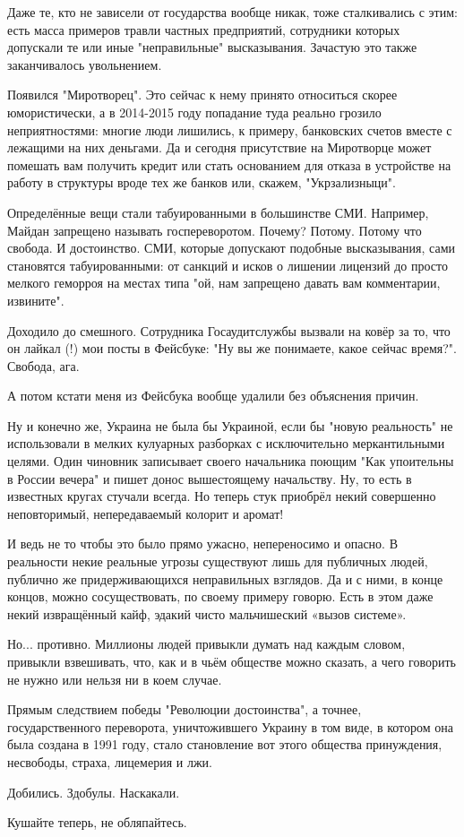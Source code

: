 Даже те, кто не зависели от государства вообще никак, тоже сталкивались с этим:
есть масса примеров травли частных предприятий, сотрудники которых допускали те
или иные "неправильные" высказывания. Зачастую это также заканчивалось
увольнением.

Появился "Миротворец". Это сейчас к нему принято относиться скорее
юмористически, а в 2014-2015 году попадание туда реально грозило
неприятностями: многие люди лишились, к примеру, банковских счетов вместе с
лежащими на них деньгами. Да и сегодня присутствие на Миротворце может помешать
вам получить кредит или стать основанием для отказа в устройстве на работу в
структуры вроде тех же банков или, скажем, "Укрзализныци". 

Определённые вещи стали табуированными в большинстве СМИ. Например, Майдан
запрещено называть госпереворотом. Почему? Потому. Потому что свобода. И
достоинство. СМИ, которые допускают подобные высказывания, сами становятся
табуированными: от санкций и исков о лишении лицензий до просто мелкого
геморроя на местах типа "ой, нам запрещено давать вам комментарии, извините". 

Доходило до смешного. Сотрудника Госаудитслужбы вызвали на ковёр за то, что он
лайкал (!) мои посты в Фейсбуке: "Ну вы же понимаете, какое сейчас время?".
Свобода, ага.

А потом кстати меня из Фейсбука вообще удалили без объяснения причин. 

Ну и конечно же, Украина не была бы Украиной, если бы "новую реальность" не
использовали в мелких кулуарных разборках с исключительно меркантильными
целями. Один чиновник записывает своего начальника поющим "Как упоительны в
России вечера" и пишет донос вышестоящему начальству. Ну, то есть в известных
кругах стучали всегда. Но теперь стук приобрёл некий совершенно неповторимый,
непередаваемый колорит и аромат!

И ведь не то чтобы это было прямо ужасно, непереносимо и опасно. В реальности
некие реальные угрозы существуют лишь для публичных людей, публично же
придерживающихся неправильных взглядов. Да и с ними, в конце концов, можно
сосуществовать, по своему примеру говорю. Есть в этом даже некий извращённый
кайф, эдакий чисто мальчишеский «вызов системе». 

Но... противно. Миллионы людей привыкли думать над каждым словом, привыкли
взвешивать, что, как и в чьём обществе можно сказать, а чего говорить не нужно
или нельзя ни в коем случае. 

Прямым следствием победы "Революции достоинства", а точнее, государственного
переворота, уничтожившего Украину в том виде, в котором она была создана в 1991
году, стало становление вот этого общества принуждения, несвободы, страха,
лицемерия и лжи. 

Добились. Здобулы. Наскакали. 

Кушайте теперь, не обляпайтесь.
